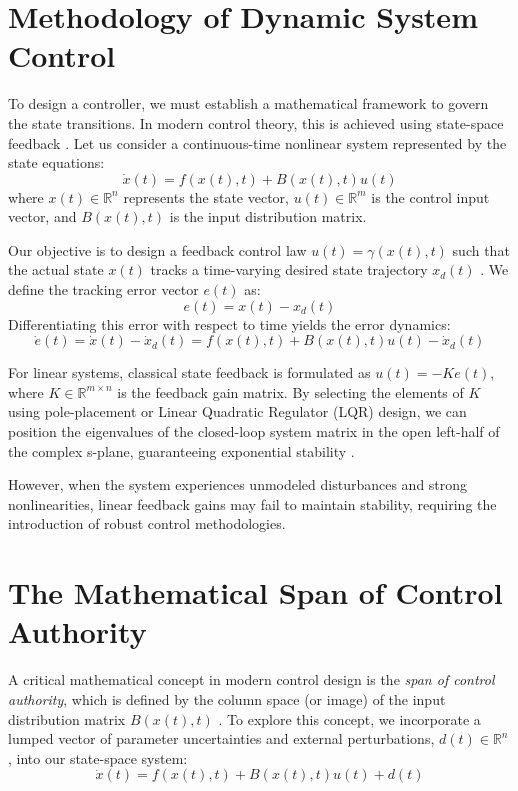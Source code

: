 \section{Methodology of Dynamic System Control}
To design a controller, we must establish a mathematical framework to govern the state transitions. In modern control theory, this is achieved using state-space feedback \cite{ref_66}. Let us consider a continuous-time nonlinear system represented by the state equations:
\begin{equation}
\dot{x}(t) = f(x(t), t) + B(x(t), t)u(t)
\end{equation}
where $x(t) \in \mathbb{R}^n$ represents the state vector, $u(t) \in \mathbb{R}^m$ is the control input vector, and $B(x(t), t)$ is the input distribution matrix.

Our objective is to design a feedback control law $u(t) = \gamma(x(t), t)$ such that the actual state $x(t)$ tracks a time-varying desired state trajectory $x_d(t)$ \cite{ref_65}. We define the tracking error vector $e(t)$ as:
\begin{equation}
e(t) = x(t) - x_d(t)
\end{equation}
Differentiating this error with respect to time yields the error dynamics:
\begin{equation}
\dot{e}(t) = \dot{x}(t) - \dot{x}_d(t) = f(x(t), t) + B(x(t), t)u(t) - \dot{x}_d(t)
\end{equation}

For linear systems, classical state feedback is formulated as $u(t) = -K e(t)$, where $K \in \mathbb{R}^{m \times n}$ is the feedback gain matrix. By selecting the elements of $K$ using pole-placement or Linear Quadratic Regulator (LQR) design, we can position the eigenvalues of the closed-loop system matrix in the open left-half of the complex s-plane, guaranteeing exponential stability \cite{ref_73}. 

However, when the system experiences unmodeled disturbances and strong nonlinearities, linear feedback gains may fail to maintain stability, requiring the introduction of robust control methodologies.

\section{The Mathematical Span of Control Authority}
A critical mathematical concept in modern control design is the \textit{span of control authority}, which is defined by the column space (or image) of the input distribution matrix $B(x(t), t)$ \cite{ref_64, ref_72}. To explore this concept, we incorporate a lumped vector of parameter uncertainties and external perturbations, $d(t) \in \mathbb{R}^n$, into our state-space system:
\begin{equation}
\dot{x}(t) = f(x(t), t) + B(x(t), t)u(t) + d(t)
\end{equation}


